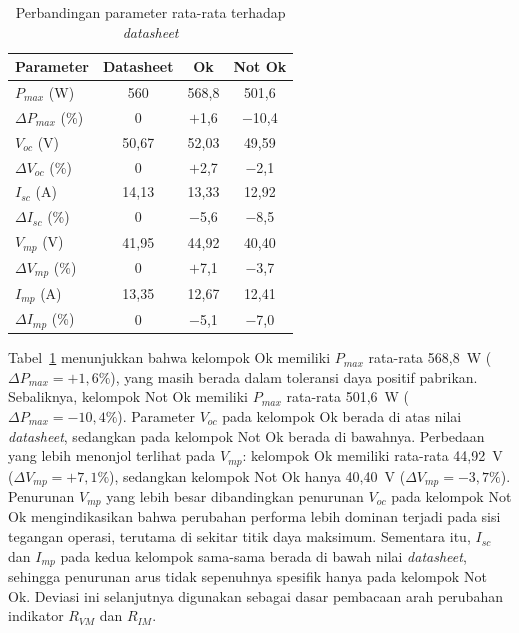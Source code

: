 \begin{table}[H]
\caption{Perbandingan parameter rata-rata terhadap \textit{datasheet}}
\label{tab:deviasi}
\centering
\begin{tabular}{lccc}
\toprule
\textbf{Parameter} & \textbf{Datasheet} & \textbf{Ok} & \textbf{Not Ok} \\
\midrule
$P_{max}$ (W)         & 560   & 568,8      & 501,6      \\
$\Delta P_{max}$ (\%) & 0     & $+$1,6     & $-$10,4    \\
$V_{oc}$ (V)          & 50,67 & 52,03      & 49,59      \\
$\Delta V_{oc}$ (\%)  & 0     & $+$2,7     & $-$2,1     \\
$I_{sc}$ (A)          & 14,13 & 13,33      & 12,92      \\
$\Delta I_{sc}$ (\%)  & 0     & $-$5,6     & $-$8,5     \\
$V_{mp}$ (V)          & 41,95 & 44,92      & 40,40      \\
$\Delta V_{mp}$ (\%)  & 0     & $+$7,1     & $-$3,7     \\
$I_{mp}$ (A)          & 13,35 & 12,67      & 12,41      \\
$\Delta I_{mp}$ (\%)  & 0     & $-$5,1     & $-$7,0     \\
\bottomrule
\end{tabular}
\end{table}

Tabel~\ref{tab:deviasi} menunjukkan bahwa kelompok Ok memiliki $P_{max}$
rata-rata 568,8~W ($\Delta P_{max} = +1{,}6\%$), yang masih berada dalam
toleransi daya positif pabrikan. Sebaliknya, kelompok Not Ok memiliki $P_{max}$
rata-rata 501,6~W ($\Delta P_{max} = -10{,}4\%$). Parameter $V_{oc}$ pada
kelompok Ok berada di atas nilai \textit{datasheet}, sedangkan pada kelompok
Not Ok berada di bawahnya. Perbedaan yang lebih menonjol terlihat pada $V_{mp}$:
kelompok Ok memiliki rata-rata 44,92~V ($\Delta V_{mp} = +7{,}1\%$), sedangkan
kelompok Not Ok hanya 40,40~V ($\Delta V_{mp} = -3{,}7\%$). Penurunan $V_{mp}$
yang lebih besar dibandingkan penurunan $V_{oc}$ pada kelompok Not Ok
mengindikasikan bahwa perubahan performa lebih dominan terjadi pada sisi
tegangan operasi, terutama di sekitar titik daya maksimum. Sementara itu,
$I_{sc}$ dan $I_{mp}$ pada kedua kelompok sama-sama berada di bawah nilai
\textit{datasheet}, sehingga penurunan arus tidak sepenuhnya spesifik hanya
pada kelompok Not Ok. Deviasi ini selanjutnya digunakan sebagai dasar pembacaan
arah perubahan indikator $R_{VM}$ dan $R_{IM}$.

